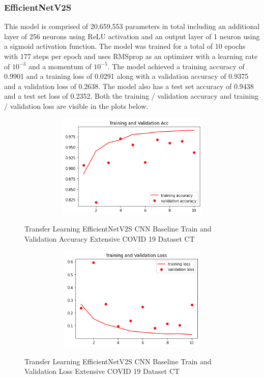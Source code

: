 \subsubsection{EfficientNetV2S}
This model is comprised of 20,659,553 parameters in total including an additional layer of 256 neurons using ReLU activation and an output layer of 1 neuron using a sigmoid activation function.  The model was trained for a total of 10 epochs with 177 steps per epoch and uses RMSprop as an optimizer with a learning rate of $10^{-3}$ and a momentum of $10^{-5}$.  The model achieved a training accuracy of 0.9901 and a training loss of 0.0291 along with a validation accuracy of 0.9375 and a validation loss of 0.2638.  The model also has a test set accuracy of 0.9438 and a test set loss of 0.2352. Both the training / validation accuracy and training / validation loss are visible in the plots below.
 \begin{figure}[H]
    \centering    \includegraphics[width=1\textwidth,height=5cm,keepaspectratio]{Images/EfficientNetV2SBaselineTrainingValidationAccuracyExtensiveCT.png}\\
    \caption{Transfer Learning EfficientNetV2S CNN Baseline Train and Validation Accuracy Extensive COVID 19 Dataset CT}
    \label{fig:EfficientNetV2S CNN Baseline Train and Validation Accuracy Extensive COVID 19 Dataset CT}
\end{figure}
 \begin{figure}[H]
    \centering
    \includegraphics[width=1\textwidth,height=5cm,keepaspectratio]{Images/EfficientNetV2SBaselineTrainingValidationLossExtensiveCT.png}\\
    \caption{Transfer Learning EfficientNetV2S CNN Baseline Train and Validation Loss Extensive COVID 19 Dataset CT}
    \label{fig:EfficientNetV2S CNN Baseline Train and Validation Loss Extensive COVID 19 Dataset CT}
\end{figure}

